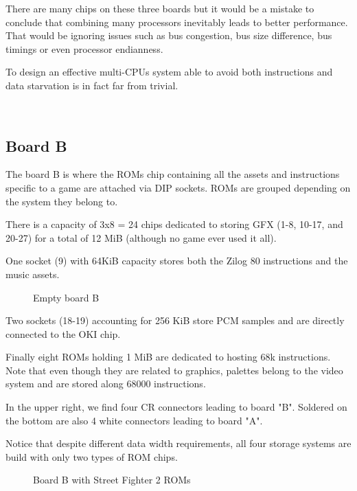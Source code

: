There are many chips on these three boards but it would be a mistake to conclude that combining many processors inevitably leads to better performance. That would be ignoring issues such as bus congestion, bus size difference, bus timings or even processor endianness. 

To design an effective multi-CPUs system able to avoid both instructions and data starvation is in fact far from trivial.


\
\label{fig:boarda}







\subsection{Board B}
   The board B is where the ROMs chip containing all the assets and instructions specific to a game are attached via DIP sockets. ROMs are grouped depending on the system they belong to. 

   There is a capacity of 3x8 = 24 chips dedicated to storing GFX (1-8, 10-17, and 20-27) for a total of 12 MiB (although no game ever used it all).

   One socket (9) with 64KiB capacity stores both the Zilog 80 instructions and the music assets.

 
\vfill
\begin{figure}[H]
  \caption*{Empty board B}
  \end{figure}

    Two sockets (18-19) accounting for 256 KiB store PCM samples and are directly connected to the OKI chip.

   Finally eight ROMs holding 1 MiB are dedicated to hosting 68k instructions. Note that even though they are related to graphics, palettes belong to the video system and are stored along 68000 instructions.

In the upper right, we find four CR connectors leading to board "B". Soldered on the bottom are also 4 white connectors leading to board "A". 


   Notice that despite different data width requirements, all four storage systems are build with only two types of ROM chips.

\vfill
\begin{figure}[H]
  \caption*{Board B with Street Fighter 2 ROMs}
  \end{figure}

